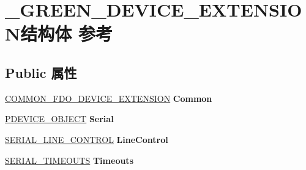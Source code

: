 \hypertarget{struct___g_r_e_e_n___d_e_v_i_c_e___e_x_t_e_n_s_i_o_n}{}\section{\+\_\+\+G\+R\+E\+E\+N\+\_\+\+D\+E\+V\+I\+C\+E\+\_\+\+E\+X\+T\+E\+N\+S\+I\+O\+N结构体 参考}
\label{struct___g_r_e_e_n___d_e_v_i_c_e___e_x_t_e_n_s_i_o_n}
\subsection*{Public 属性}
\begin{DoxyCompactItemize}
\item 
\mbox{\label{struct___g_r_e_e_n___d_e_v_i_c_e___e_x_t_e_n_s_i_o_n_ac9ba38386c72062b562f5325ce48e650}} 
\hyperlink{struct___c_o_m_m_o_n___f_d_o___d_e_v_i_c_e___e_x_t_e_n_s_i_o_n}{C\+O\+M\+M\+O\+N\+\_\+\+F\+D\+O\+\_\+\+D\+E\+V\+I\+C\+E\+\_\+\+E\+X\+T\+E\+N\+S\+I\+ON} {\bfseries Common}
\item 
\mbox{\label{struct___g_r_e_e_n___d_e_v_i_c_e___e_x_t_e_n_s_i_o_n_a2a4c9bf641692f888893964b41085e28}} 
\hyperlink{struct___d_e_v_i_c_e___o_b_j_e_c_t}{P\+D\+E\+V\+I\+C\+E\+\_\+\+O\+B\+J\+E\+CT} {\bfseries Serial}
\item 
\mbox{\label{struct___g_r_e_e_n___d_e_v_i_c_e___e_x_t_e_n_s_i_o_n_a0355de600100a953c16112950143cacf}} 
\hyperlink{struct___s_e_r_i_a_l___l_i_n_e___c_o_n_t_r_o_l}{S\+E\+R\+I\+A\+L\+\_\+\+L\+I\+N\+E\+\_\+\+C\+O\+N\+T\+R\+OL} {\bfseries Line\+Control}
\item 
\mbox{\label{struct___g_r_e_e_n___d_e_v_i_c_e___e_x_t_e_n_s_i_o_n_ae7359643b2caeca7543e04c74cce853c}} 
\hyperlink{struct___s_e_r_i_a_l___t_i_m_e_o_u_t_s}{S\+E\+R\+I\+A\+L\+\_\+\+T\+I\+M\+E\+O\+U\+TS} {\bfseries Timeouts}
\item 
\mbox{\label{struct___g_r_e_e_n___d_e_v_i_c_e___e_x_t_e_n_s_i_o_n_ad54488ce698bfaf3540d30d9608dda00}} 

\end{DoxyCompactItemize}
